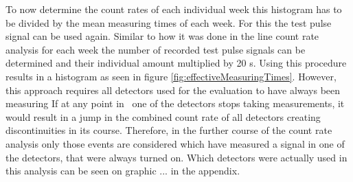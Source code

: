 \documentclass[encoding=utf8,british]{tumphthesis}
\begin{document}
To now determine the count rates of each individual week this histogram has to be divided by the mean measuring times of each week.
For this the test pulse signal can be used again.
Similar to how it was done in the line count rate analysis for each week the number of recorded test pulse signals can be determined and their individual amount multiplied by 20 s.
Using this procedure results in a histogram as seen in figure \ref{fig:effectiveMeasuringTimes}.
However, this approach requires all detectors used for the evaluation to have always been measuring 
If at any point in \PII\ one of the detectors stops taking measurements, it would result in a jump in the combined count rate of all detectors creating discontinuities in its course.    
Therefore, in the further course of the count rate analysis only those events are considered which have measured a signal in one of the detectors, that were always turned on.
Which detectors were actually used in this analysis can be seen on graphic ... in the appendix.
\\
\end{document}
